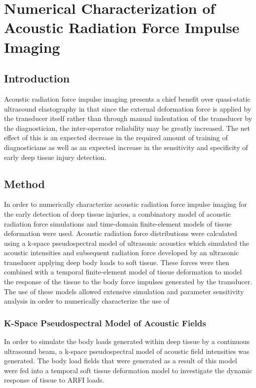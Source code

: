 \chapter{Numerical Characterization of Acoustic Radiation Force Impulse Imaging}
	\label{chap:arfi}
	\section{Introduction}
		Acoustic radiation force impulse imaging presents a chief benefit over quasi-static ultrasound elastography in that since the external deformation force is applied by the transducer itself rather than through manual indentation of the transducer by the diagnostician, the inter-operator reliability may be greatly increased. The net effect of this is an expected decrease in the required amount of training of diagnosticians as well as an expected increase in the sensitivity and specificity of early deep tissue injury detection.

	\section{Method}
	\label{sec:arfi_methods}
		In order to numerically characterize acoustic radiation force impulse imaging for the early detection of deep tissue injuries, a combinatory model of acoustic radiation force simulations and time-domain finite-element models of tissue deformation were used. Acoustic radiation force distributions were calculated using a k-space pseudospectral model of ultrasonic acoustics which simulated the acoustic intensities and subsequent radiation force developed by an ultrasonic transducer applying deep body loads to soft tissue. These forces were then combined with a temporal finite-element model of tissue deformation to model the response of the tissue to the body force impulses generated by the transducer. The use of these models allowed extensive simulation and parameter sensitivity analysis in order to numerically characterize the use of 

		\subsection{K-Space Pseudospectral Model of Acoustic Fields}
		\label{subsec:kspace_model}
			In order to simulate the body loads generated within deep tissue by a continuous ultrasound beam, a k-space pseudospectral model of acoustic field intensities was generated. The body load fields that were generated as a result of this model were fed into a temporal soft tissue deformation model to investigate the dynamic response of tissue to ARFI loads.

